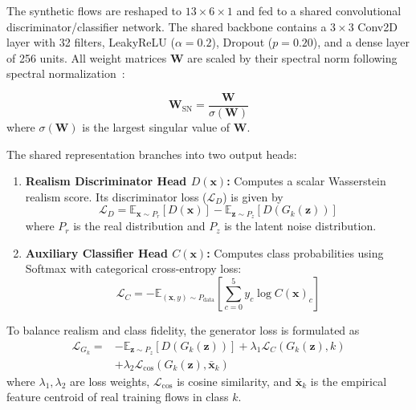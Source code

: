 \documentclass[conference]{IEEEtran}
\begin{document}
The synthetic flows are reshaped to $13 \times 6 \times 1$ and fed to a shared convolutional discriminator/classifier network. The shared backbone contains a $3 \times 3$ Conv2D layer with 32 filters, LeakyReLU ($\alpha = 0.2$), Dropout ($p = 0.20$), and a dense layer of 256 units. All weight matrices $\mathbf{W}$ are scaled by their spectral norm following spectral normalization~\cite{miyato2018spectral}:

\begin{equation}
\mathbf{W}_{\text{SN}} = \frac{\mathbf{W}}{\sigma(\mathbf{W})}
\end{equation}
where $\sigma(\mathbf{W})$ is the largest singular value of $\mathbf{W}$.

The shared representation branches into two output heads:
\begin{enumerate}
    \item \textbf{Realism Discriminator Head $D(\mathbf{x})$:} Computes a scalar Wasserstein realism score. Its discriminator loss ($\mathcal{L}_D$) is given by
    \begin{equation}
    \mathcal{L}_D = \mathbb{E}_{\mathbf{x} \sim P_r}[D(\mathbf{x})] - \mathbb{E}_{\mathbf{z} \sim P_z}[D(G_k(\mathbf{z}))]
    \end{equation}
    where $P_r$ is the real distribution and $P_z$ is the latent noise distribution.

    \item \textbf{Auxiliary Classifier Head $C(\mathbf{x})$:} Computes class probabilities using Softmax with categorical cross-entropy loss:
    \begin{equation}
    \mathcal{L}_C = -\mathbb{E}_{(\mathbf{x}, y) \sim P_{\text{data}}} \left[ \sum_{c=0}^{5} y_c \log C(\mathbf{x})_c \right]
    \end{equation}
\end{enumerate}

To balance realism and class fidelity, the generator loss is formulated as
\begin{equation}
\begin{aligned}
\mathcal{L}_{G_k} = &-\mathbb{E}_{\mathbf{z} \sim P_z}[D(G_k(\mathbf{z}))] + \lambda_1 \mathcal{L}_C(G_k(\mathbf{z}), k) \\
&+ \lambda_2 \mathcal{L}_{\text{cos}}(G_k(\mathbf{z}), \bar{\mathbf{x}}_k)
\end{aligned}
\end{equation}
where $\lambda_1, \lambda_2$ are loss weights, $\mathcal{L}_{\text{cos}}$ is cosine similarity, and $\bar{\mathbf{x}}_k$ is the empirical feature centroid of real training flows in class $k$.
\end{document}
